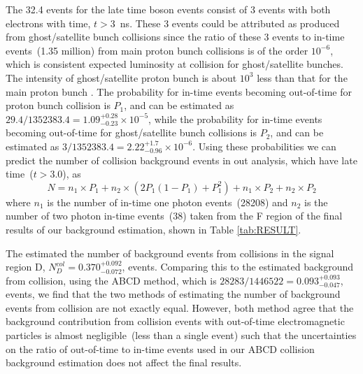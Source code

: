 \vspace{5mm}
The 32.4 events for the late time \PZ boson events consist of 3 \PZ events with both electrons with time, $t > 3$~ns. These 3 \PZ events could be attributed as produced from ghost/satellite bunch collisions since the ratio of these 3 events to in-time \PZ events~(1.35 million) from main proton bunch collisions is of the order $10^{-6}$, which is consistent expected luminosity at collision for ghost/satellite bunches. The intensity of ghost/satellite proton bunch is about $10^{3}$ less than that for the main proton bunch \cite{ATLAS-GHOST,CMS-GHOST}. 
\newline
The probability for in-time events becoming out-of-time for proton bunch collision is $P_{1}$, and can be estimated as $29.4/1352383.4 = 1.09^{+0.28}_{-0.23} \times 10^{-5}$, while the probability for in-time events becoming out-of-time for ghost/satellite bunch collisions is $P_{2}$, and can be estimated as $3/1352383.4 = 2.22^{+1.7}_{-0.96}\times 10^{-6}$. 
\newline
Using these probabilities we can predict the number of collision background events in out analysis, which have late time~($t > 3.0$), as
\begin{equation}
  N = n_{1} \times P_{1} + n_{2} \times (2P_{1}(1 - P_{1}) + P_{1}^{2}) + n_{1} \times P_{2} + n_{2} \times P_{2}
\end{equation}
where $n_{1}$ is the number of in-time one photon events~(28208) and $n_{2}$ is the number of two photon in-time events~(38) taken from the \textsf{F} region of the final results of our background estimation, shown in Table \ref{tab:RESULT}. 
\par
The estimated the number of background events from collisions in the signal region \textsf{D}, $N^{col}_{D} = 0.370^{+0.092}_{-0.072}$, events. Comparing this to the estimated background from collision, using the \textsf{ABCD} method, which is $28283/1446522 = 0.093^{+0.093}_{-0.047}$, events, we find that the two methods of estimating the number of background events from collision are not exactly equal. 
However, both method agree that the background contribution from collision events with out-of-time electromagnetic particles is almost negligible~(less than a single event) such that the uncertainties on the ratio of out-of-time to in-time events used in our \textsf{ABCD} collision background estimation does not affect the final results.
